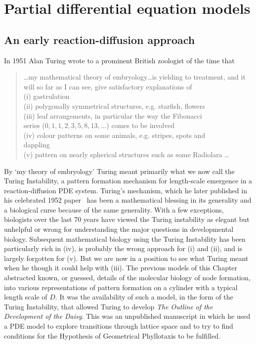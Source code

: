 \section{Partial differential equation models}
\subsection{An early reaction-diffusion approach}
 In 1951 Alan Turing wrote to a prominent British zoologist of the time that 
\begin{quotation}
	\dots my mathematical theory of embryology\dots is yielding to 
	treatment, and it will so far as I can see, give satisfactory 
	explanations of\\
	(i) gastrulation\\
	(ii) polygonally symmetrical structures, e.g. starfish, flowers\\
	(iii) leaf arrangements, in particular the way the Fibonacci \\
	series ($0,1,1,2,3,5,8,13,\dots$) comes to be involved\\
	(iv) colour patterns on some animals, e.g. stripes, spots and \\
	dappling\\
	(v) pattern on nearly spherical structures such as some Radiolara \dots{}
\end{quotation}
By `my theory of embryology' Turing meant primarily what we now call the Turing Instability, a  pattern formation mechanism for length-scale emergence in a reaction-diffusion PDE system. 
Turing's mechanism, which he later published in his celebrated 1952 paper~\autocite{turingChemicalBasisMorphogenesis1952} has been a mathematical blessing in its generality and a biological curse because of the same generality. With a few exceptions, biologists over the last 70 years have viewed the Turing instability as elegant but unhelpful or wrong for understanding the major questions in developmental biology. 	 Subsequent mathematical biology using the Turing Instability has been particularly rich in (iv), is probably the wrong approach for (i) and (ii), and is largely forgotten for  (v). But we are now in a position to see what Turing meant when he though it could help with (iii). 
The previous models of this Chapter abstracted known, or guessed, details of the molecular biology of node formation, into various representations of pattern formation on a cylinder with a typical length scale of $D$. It was the availability of such a model, in the form of the Turing Instability,  that allowed Turing to develop \textit{The Outline of the Development of the Daisy}. This was an unpublished manuscript in which he used a PDE model to explore transitions through lattice space and to try to find conditions for  the Hypothesis of Geometrical Phyllotaxis to be fulfilled.


